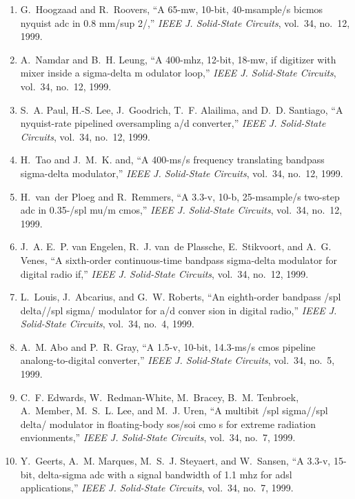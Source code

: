 \begin{enumerate}
\item
G.~Hoogzaad and R.~Roovers, ``A 65-mw, 10-bit, 40-msample/s bicmos nyquist adc
  in 0.8 mm/sup 2/,'' \emph{{IEEE} J. Solid-State Circuits}, vol.~34, no.~12,
  1999.

\item
A.~Namdar and B.~H. Leung, ``A 400-mhz, 12-bit, 18-mw, if digitizer with mixer
  inside a sigma-delta m odulator loop,'' \emph{{IEEE} J. Solid-State
  Circuits}, vol.~34, no.~12, 1999.

\item
S.~A. Paul, H.-S. Lee, J.~Goodrich, T.~F. Alailima, and D.~D. Santiago, ``A
  nyquist-rate pipelined oversampling a/d converter,'' \emph{{IEEE} J.
  Solid-State Circuits}, vol.~34, no.~12, 1999.

\item
H.~Tao and J.~M.~K. and, ``A 400-ms/s frequency translating bandpass
  sigma-delta modulator,'' \emph{{IEEE} J. Solid-State Circuits}, vol.~34,
  no.~12, 1999.

\item
H.~van~der Ploeg and R.~Remmers, ``A 3.3-v, 10-b, 25-msample/s two-step adc in
  0.35-/spl mu/m cmos,'' \emph{{IEEE} J. Solid-State Circuits}, vol.~34,
  no.~12, 1999.

\item
J.~A. E.~P. van Engelen, R.~J. van~de Plassche, E.~Stikvoort, and A.~G. Venes,
  ``A sixth-order continuous-time bandpass sigma-delta modulator for digital
  radio if,'' \emph{{IEEE} J. Solid-State Circuits}, vol.~34, no.~12, 1999.

\item
L.~Louis, J.~Abcarius, and G.~W. Roberts, ``An eighth-order bandpass /spl
  delta//spl sigma/ modulator for a/d conver sion in digital radio,''
  \emph{{IEEE} J. Solid-State Circuits}, vol.~34, no.~4, 1999.

\item
A.~M. Abo and P.~R. Gray, ``A 1.5-v, 10-bit, 14.3-ms/s cmos pipeline
  analong-to-digital converter,'' \emph{{IEEE} J. Solid-State Circuits},
  vol.~34, no.~5, 1999.

\item
C.~F. Edwards, W.~Redman-White, M.~Bracey, B.~M. Tenbroek, A.~Member, M.~S.~L.
  Lee, and M.~J. Uren, ``A multibit /spl sigma//spl delta/ modulator in
  floating-body sos/soi cmo s for extreme radiation envionments,'' \emph{{IEEE}
  J. Solid-State Circuits}, vol.~34, no.~7, 1999.

\item
Y.~Geerts, A.~M. Marques, M.~S.~J. Steyaert, and W.~Sansen, ``A 3.3-v, 15-bit,
  delta-sigma adc with a signal bandwidth of 1.1 mhz for adsl applications,''
  \emph{{IEEE} J. Solid-State Circuits}, vol.~34, no.~7, 1999.


\end{enumerate}
